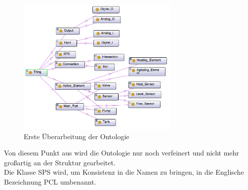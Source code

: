 \begin{figure}[hbt!]
  \centering
  \includegraphics[width=0.7\textwidth]{graphics/implementation/Ontology_v2}
  \caption{Erste Überarbeitung der Ontologie}
  \label{fig:v2_ontology}
\end{figure}

Von diesem Punkt aus wird die Ontologie nur noch verfeinert und nicht mehr großartig an der Struktur gearbeitet.\\
Die Klasse \ac{SPS} wird, um Konsistenz in die Namen zu bringen, in die Englische Bezeichnung PCL umbenannt. 


